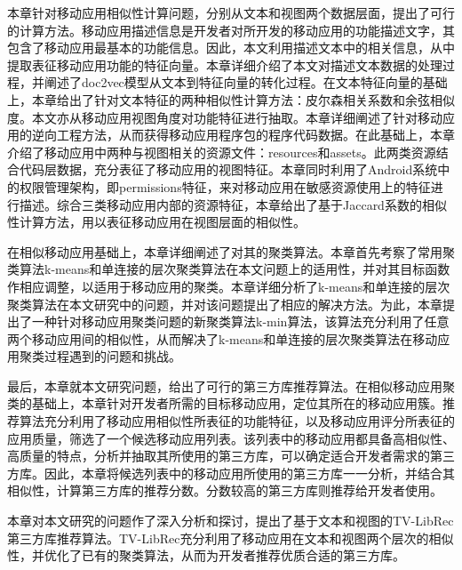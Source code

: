 本章针对移动应用相似性计算问题，分别从文本和视图两个数据层面，提出了可行的计算方法。移动应用描述信息是开发者对所开发的移动应用的功能描述文字，其包含了移动应用最基本的功能信息。因此，本文利用描述文本中的相关信息，从中提取表征移动应用功能的特征向量。本章详细介绍了本文对描述文本数据的处理过程，并阐述了doc2vec模型从文本到特征向量的转化过程。在文本特征向量的基础上，本章给出了针对文本特征的两种相似性计算方法：皮尔森相关系数和余弦相似度。本文亦从移动应用视图角度对功能特征进行抽取。本章详细阐述了针对移动应用的逆向工程方法，从而获得移动应用程序包的程序代码数据。在此基础上，本章介绍了移动应用中两种与视图相关的资源文件：resources和assets。此两类资源结合代码层数据，充分表征了移动应用的视图特征。本章同时利用了Android系统中的权限管理架构，即permissions特征，来对移动应用在敏感资源使用上的特征进行描述。综合三类移动应用内部的资源特征，本章给出了基于Jaccard系数的相似性计算方法，用以表征移动应用在视图层面的相似性。

在相似移动应用基础上，本章详细阐述了对其的聚类算法。本章首先考察了常用聚类算法k-means和单连接的层次聚类算法在本文问题上的适用性，并对其目标函数作相应调整，以适用于移动应用的聚类。本章详细分析了k-means和单连接的层次聚类算法在本文研究中的问题，并对该问题提出了相应的解决方法。为此，本章提出了一种针对移动应用聚类问题的新聚类算法k-min算法，该算法充分利用了任意两个移动应用间的相似性，从而解决了k-means和单连接的层次聚类算法在移动应用聚类过程遇到的问题和挑战。

最后，本章就本文研究问题，给出了可行的第三方库推荐算法。在相似移动应用聚类的基础上，本章针对开发者所需的目标移动应用，定位其所在的移动应用簇。推荐算法充分利用了移动应用相似性所表征的功能特征，以及移动应用评分所表征的应用质量，筛选了一个候选移动应用列表。该列表中的移动应用都具备高相似性、高质量的特点，分析并抽取其所使用的第三方库，可以确定适合开发者需求的第三方库。因此，本章将候选列表中的移动应用所使用的第三方库一一分析，并结合其相似性，计算第三方库的推荐分数。分数较高的第三方库则推荐给开发者使用。

本章对本文研究的问题作了深入分析和探讨，提出了基于文本和视图的TV-LibRec第三方库推荐算法。TV-LibRec充分利用了移动应用在文本和视图两个层次的相似性，并优化了已有的聚类算法，从而为开发者推荐优质合适的第三方库。